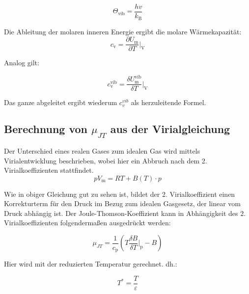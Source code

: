 \documentclass[12pt,a4paper,titlepage,headinclude,bibtotoc]{scrartcl}
\begin{document}
\begin{equation}
\Theta_\mathrm{vib} = \frac{hv}{k_\mathrm{B}}
\end{equation}


Die Ableitung der molaren inneren Energie ergibt die molare Wärmekapazität:\\


\begin{equation}
c_\mathrm{v} = \frac{\partial U_\mathrm{m}}{\partial T}\bigg \vert_\mathrm{V}
\end{equation}

Analog gilt:

\begin{equation}
c_\mathrm{v}^\mathrm{vib} = \frac{\delta U_\mathrm{m}^\mathrm{vib}}{\delta T}\bigg \vert_\mathrm{V}
\end{equation}

Das ganze abgeleitet ergibt wiederum $c_v^{vib}$ als herzuleitende Formel.\\


\subsection{Berechnung von $\mu_{JT}$ aus der Virialgleichung}

Der Unterschied eines realen Gases zum idealen Gas wird mittels Virialentwicklung beschrieben, wobei hier ein Abbruch nach dem 2. Virialkoeffizienten stattfindet.\\

\begin{equation}
pV_\mathrm{m} = RT + B(T) \cdot p
\end{equation}

Wie in obiger Gleichung gut zu sehen ist, bildet der 2. Virialkoeffizient einen Korrekturterm für den Druck im Bezug zum idealen Gasgesetz, der linear vom Druck abhängig ist.
Der Joule-Thomson-Koeffizient kann in Abhängigkeit des 2. Virialkoeffizienten folgendermaßen ausgedrückt werden:

\begin{equation}
\mu_{JT} = \frac{1}{c_\mathrm{p}}\left( T \frac{\delta B}{\delta T} \bigg \vert_\mathrm{p} - B\right)
\end{equation}

Hier wird mit der reduzierten Temperatur gerechnet. dh.: 

\begin{equation}
T^* = \frac{T}{\varepsilon}
\end{equation}
\end{document}
